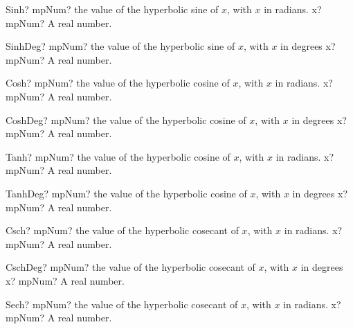 \documentclass[12pt,a4paper,openany]{book}
\begin{document}
\begin{mpFunctionsExtract}
\mpFunctionOne
{Sinh? mpNum? the value of the hyperbolic sine of $x$, with $x$ in radians.}
{x? mpNum? A real number.}
\end{mpFunctionsExtract}

\begin{mpFunctionsExtract}
\mpFunctionOne
{SinhDeg? mpNum? the value of the hyperbolic sine of $x$, with $x$ in degrees}
{x? mpNum? A real number.}
\end{mpFunctionsExtract}

\begin{mpFunctionsExtract}
\mpFunctionOne
{Cosh? mpNum? the value of the hyperbolic cosine of $x$, with $x$ in radians.}
{x? mpNum? A real number.}
\end{mpFunctionsExtract}

\begin{mpFunctionsExtract}
\mpFunctionOne
{CoshDeg? mpNum? the value of the hyperbolic cosine of $x$, with $x$ in degrees}
{x? mpNum? A real number.}
\end{mpFunctionsExtract}

\begin{mpFunctionsExtract}
\mpFunctionOne
{Tanh? mpNum? the value of the hyperbolic cosine of $x$, with $x$ in radians.}
{x? mpNum? A real number.}
\end{mpFunctionsExtract}

\begin{mpFunctionsExtract}
\mpFunctionOne
{TanhDeg? mpNum? the value of the hyperbolic cosine of $x$, with $x$ in degrees}
{x? mpNum? A real number.}
\end{mpFunctionsExtract}

\begin{mpFunctionsExtract}
\mpFunctionOne
{Csch? mpNum? the value of the hyperbolic cosecant of $x$, with $x$ in radians.}
{x? mpNum? A real number.}
\end{mpFunctionsExtract}

\begin{mpFunctionsExtract}
\mpFunctionOne
{CschDeg? mpNum? the value of the hyperbolic cosecant of $x$, with $x$ in degrees}
{x? mpNum? A real number.}
\end{mpFunctionsExtract}

\begin{mpFunctionsExtract}
\mpFunctionOne
{Sech? mpNum? the value of the hyperbolic cosecant of $x$, with $x$ in radians.}
{x? mpNum? A real number.}
\end{mpFunctionsExtract}
\end{document}
